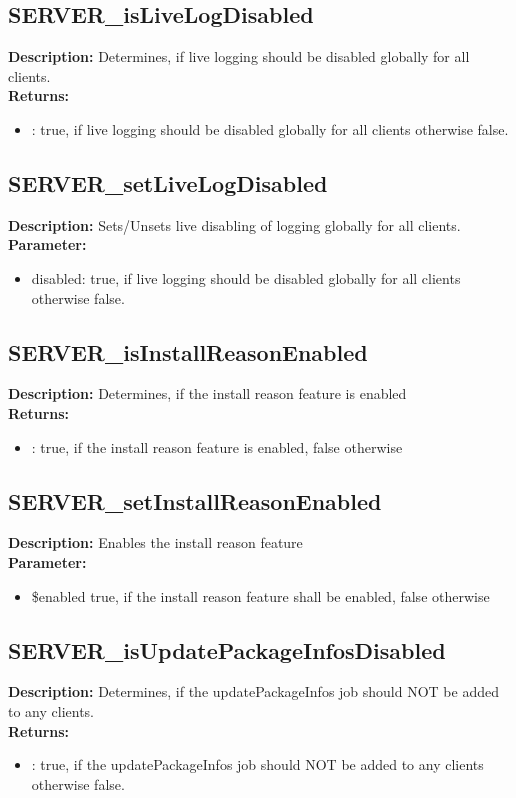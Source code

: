 \subsection{SERVER\_isLiveLogDisabled}
\textbf{Description:} Determines, if live logging should be disabled globally for all clients.\\
\textbf{Returns:}
\begin{itemize}
\item : true, if live logging should be disabled globally for all clients otherwise false.
\end{itemize}

\subsection{SERVER\_setLiveLogDisabled}
\textbf{Description:} Sets/Unsets live disabling of logging globally for all clients.\\
\textbf{Parameter:}
\begin{itemize}
\item disabled: true, if live logging should be disabled globally for all clients otherwise false.
\end{itemize}

\subsection{SERVER\_isInstallReasonEnabled}
\textbf{Description:} Determines, if the install reason feature is enabled\\
\textbf{Returns:}
\begin{itemize}
\item : true, if the install reason feature is enabled, false otherwise
\end{itemize}

\subsection{SERVER\_setInstallReasonEnabled}
\textbf{Description:} Enables the install reason feature\\
\textbf{Parameter:}
\begin{itemize}
\item \$enabled true, if the install reason feature shall be enabled, false otherwise
\end{itemize}

\subsection{SERVER\_isUpdatePackageInfosDisabled}
\textbf{Description:} Determines, if the updatePackageInfos job should NOT be added to any clients.\\
\textbf{Returns:}
\begin{itemize}
\item : true, if the updatePackageInfos job should NOT be added to any clients otherwise false.
\end{itemize}


